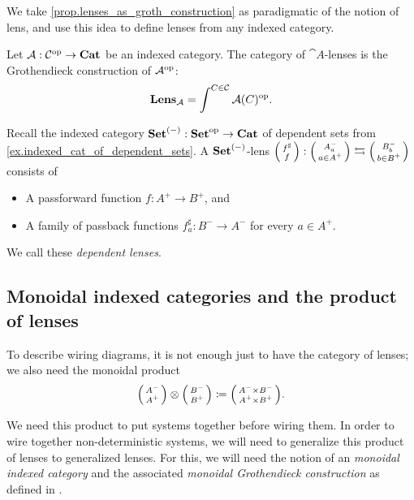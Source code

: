 \documentclass[DynamicalBook]{subfiles}
\begin{document}
We take \cref{prop.lenses_as_groth_construction} as paradigmatic of the notion
of lens, and use this idea to define lenses from any indexed category.

\begin{definition}\label{def.groth_lens}
 Let $\mathcal{A} : \mathcal{C}^{\textnormal{op}} \to \textbf{Cat}$ be an indexed category. The category of $\cat{A}$-lenses is the Grothendieck construction of
     $\mathcal{A}^{\textnormal{op}}$:
$$\textbf{Lens}_{\mathcal{A}} = \int^{C \in \mathcal{C}} \mathcal{A}(C)^{\textnormal{op}}.$$
\end{definition}

\begin{example}\label{ex.dependent_lenses_via_groth}
Recall the indexed category $\textbf{Set}^{(-)} : \textbf{Set}^{\textnormal{op}} \to \textbf{Cat}$ of
dependent sets from \cref{ex.indexed_cat_of_dependent_sets}. A
$\textbf{Set}^{(-)}$-lens $\lens{f^{\sharp}}{f} : \lens{A^-_a}{a \in A^+} \fromto
\lens{B^-_b}{b \in B^+}$ consists of
\begin{itemize}
\item A passforward function $f : A^+ \to B^+$, and
  \item A family of passback functions $f^{\sharp}_{a} : B^- \to A^-$ for every
    $a \in A^+$.
\end{itemize}
We call these \emph{dependent lenses}.
\end{example}

\subsection{Monoidal indexed categories and the product of lenses}

To describe wiring diagrams, it is not enough just to have the category of
lenses; we also need the monoidal product 
$$\lens{A^-}{A^+} \otimes \lens{B^-}{B^+} \coloneqq \lens{A^- \times B^-}{A^+
  \times B^+}.$$

We need this product to put systems together before wiring them. In order to
wire together non-deterministic systems, we will need to generalize this product
of lenses to generalized lenses. For this, we will need the notion of an
\emph{monoidal indexed category} and the associated \emph{monoidal Grothendieck
  construction} as defined in \cite{moeller2018monoidal}.
\end{document}
